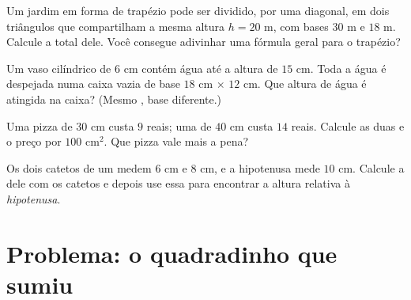\begin{exercise}[$\star\star$]\label{exo:g7:areas:9}
Um jardim em forma de trapézio pode ser dividido, por uma diagonal, em
dois triângulos que compartilham a mesma altura $h = 20$ m, com bases
$30$ m e $18$ m. Calcule a  total dele. Você consegue adivinhar uma
fórmula geral para o trapézio?
\end{exercise}

\begin{exercise}[$\star\star$]\label{exo:g7:areas:10}
Um vaso cilíndrico de  $6$ cm contém água até a altura de $15$ cm.
Toda a água é despejada numa caixa vazia de base
$18$ cm $\times$ $12$ cm. Que altura de água é atingida na caixa?
(Mesmo , base diferente.)
\end{exercise}

\begin{exercise}[$\star\star$]\label{exo:g7:areas:11}
Uma pizza de  $30$ cm custa $9$ reais; uma de  $40$ cm
custa $14$ reais. Calcule as duas  e o preço por $100$ cm$^2$.
Que pizza vale mais a pena?
\end{exercise}

\begin{exercise}[$\star\star\star$]\label{exo:g7:areas:12}
Os dois catetos de um  medem $6$ cm e $8$ cm, e a
hipotenusa mede $10$ cm. Calcule a  dele com os catetos e depois
use essa  para encontrar a altura relativa à \emph{hipotenusa}.
\end{exercise}

\section{Problema: o quadradinho que sumiu}

